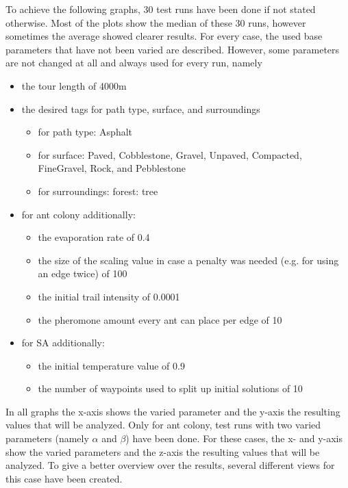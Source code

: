 To achieve the following graphs, 30 test runs have been done if not stated otherwise. 
Most of the plots show the median of these 30 runs, however sometimes the average showed clearer results.
For every case, the used base parameters that have not been varied are described.
However, some parameters are not changed at all and always used for every run, namely
\begin{itemize}
	\item the tour length of 4000m
	\item the desired tags for path type, surface, and surroundings
	\begin{itemize}
		\item for path type: Asphalt
		\item for surface: Paved, Cobblestone, Gravel, Unpaved, Compacted, FineGravel, Rock, and Pebblestone
		\item for surroundings: forest: tree
	\end{itemize}
	\item for ant colony additionally:
	\begin{itemize}
		\item the evaporation rate of 0.4
		\item the size of the scaling value in case a penalty was needed (e.g. for using an edge twice) of 100
		\item the initial trail intensity of 0.0001
		\item the pheromone amount every ant can place per edge of 10
	\end{itemize}
	\item for SA additionally:
	\begin{itemize}
		\item the initial temperature value of 0.9
		\item the number of waypoints used to split up initial solutions of 10
	\end{itemize}
\end{itemize}

In all graphs the x-axis shows the varied parameter and the y-axis the resulting values that will be analyzed.
Only for ant colony, test runs with two varied parameters (namely $\alpha$ and $\beta$) have been done.
For these cases, the x- and y-axis show the varied parameters and the z-axis the resulting values that will be analyzed.
To give a better overview over the results, several different views for this case have been created.


